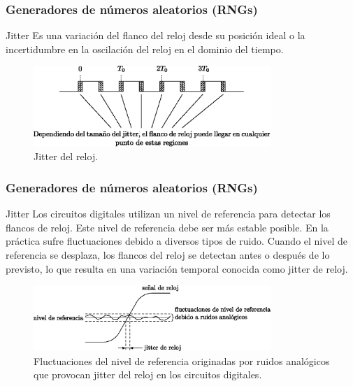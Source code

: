 \documentclass[10pt]{beamer}
\begin{document}
\begin{frame}
    \frametitle{Generadores de números aleatorios (RNGs)}
    \begin{block}{Jitter}
        \justifying
         Es una variación del flanco del reloj desde su posición ideal o la incertidumbre en la oscilación del reloj en el dominio del tiempo.
	\end{block}
	\begin{figure}[hbtp]
        \centering
        \includegraphics[width=0.8\textwidth]{F9_jitter}
        \caption{Jitter del reloj.}
        \label{fig:F9_jitter}
    \end{figure}
\end{frame}


\begin{frame}
    \frametitle{Generadores de números aleatorios (RNGs)}
    \begin{block}{Jitter}
        \justifying
         Los circuitos digitales utilizan un nivel de referencia para detectar los flancos de reloj. Este nivel de referencia debe ser más estable posible. En la práctica sufre fluctuaciones debido a diversos tipos de ruido. Cuando el nivel de referencia se desplaza, los flancos del reloj se detectan antes o después de lo previsto, lo que resulta en una variación temporal conocida como jitter de reloj.
	\end{block}
    \begin{figure}[hbtp]
        \centering
        \includegraphics[width=0.8\textwidth]{F10_fluctuaciones}
        \caption{Fluctuaciones del nivel de referencia originadas por ruidos analógicos que provocan jitter del reloj en los circuitos digitales. \cite{Petura2019}}
        \label{fig:F10_fluctuaciones}
    \end{figure}
\end{frame}
\end{document}
